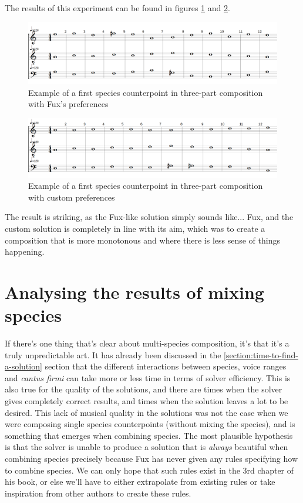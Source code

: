 The results of this experiment can be found in figures \ref{fig:musicality-1sp-fux} and \ref{fig:musicality-1sp-custom}.
\begin{figure}[h]
    \centering
    \includegraphics[width=1\textwidth]{Images/Musicality/musicality-1sp-fux-pref.png}
    \caption{Example of a first species counterpoint in three-part composition with Fux's preferences}
    \label{fig:musicality-1sp-fux}
\end{figure}

\begin{figure}[h]
    \centering
    \includegraphics[width=1\textwidth]{Images/Musicality/musicality-1sp-custom-pref.png}
    \caption{Example of a first species counterpoint in three-part composition with custom preferences}
    \label{fig:musicality-1sp-custom}
\end{figure}

The result is striking, as the Fux-like solution simply sounds like... Fux, and the custom solution is completely in line with its aim, which was to create a composition that is more monotonous and where there is less sense of things happening.

\section{Analysing the results of mixing species}
If there's one thing that's clear about multi-species composition, it's that it's a truly unpredictable art. It has already been discussed in the \ref{section:time-to-find-a-solution} section that the different interactions between species, voice ranges and \textit{cantus firmi} can take more or less time in terms of solver efficiency. This is also true for the quality of the solutions, and there are times when the solver gives completely correct results, and times when the solution leaves a lot to be desired. This lack of musical quality in the solutions was not the case when we were composing single species counterpoints (without mixing the species), and is something that emerges when combining species. The most plausible hypothesis is that the solver is unable to produce a solution that is \textit{always} beautiful when combining species precisely because Fux has never given any rules specifying how to combine species. We can only hope that such rules exist in the 3rd chapter of his book, or else we'll have to either extrapolate from existing rules or take inspiration from other authors to create these rules.

